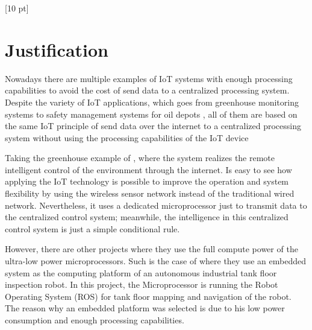 \titleformat{\chapter}{\Huge\bfseries}{\thechapter}{0 pt}{\rule{340 pt}{3 pt}\\}
\titlespacing{\chapter}{100 pt}{-25 pt}{40 pt}[10 pt]	
\pagestyle{fancy}
\fancyhead[RO,RE]{\thepage}
\fancyfoot[CO,CE]{}

\chapter*{Justification}

\normalsize
\noindent

Nowadays there are multiple examples of IoT systems with enough processing
capabilities to avoid the cost of send data to a centralized processing system.
Despite the variety of IoT applications, which goes from greenhouse monitoring
systems \cite{Liu-Dan} to safety management systems for oil depots \cite{Du}, all
of them are based on the same IoT principle of send data over the internet to a
centralized processing system without using the processing capabilities of the
IoT device 

Taking the greenhouse example of \cite{Du}, where the system realizes the
remote intelligent control of the environment through the internet. Is easy to
see how applying the IoT technology is possible to improve the operation and
system flexibility by using the wireless sensor network instead of the
traditional wired network. Nevertheless, it uses a dedicated microprocessor
just to transmit data to the centralized control system; meanwhile, the
intelligence in this centralized control system is just a simple conditional
rule.

However, there are other projects where they  use the full compute power of the
ultra-low power microprocessors. Such is the case of \cite{Wun} where they use
an embedded system as the computing platform of an autonomous industrial tank
floor inspection robot. In this project, the Microprocessor is running the
Robot Operating System (ROS) for tank floor mapping and navigation of the
robot. The reason why an embedded platform was selected is due to his low power
consumption and enough processing capabilities. 

